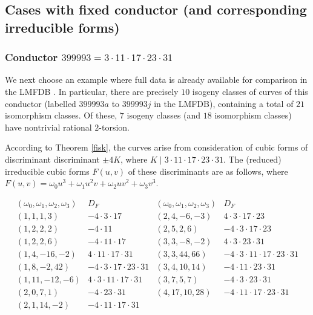 \subsection{Cases with fixed conductor (and corresponding irreducible forms)}

\subsubsection{Conductor $399993 = 3 \cdot 11 \cdot 17 \cdot 23 \cdot 31$} \label{exe1}

We next choose an example where full data is already available for comparison in the LMFDB \cite{LMFDB}. In particular, there are precisely $10$ isogeny classes of curves of this conductor (labelled $399993a$ to $399993j$ in the LMFDB), containing a total of $21$ isomorphism classes. Of these, $7$ isogeny classes (and $18$ isomorphism classes) have nontrivial rational $2$-torsion.

According to Theorem \ref{fisk}, the curves arise from  consideration of cubic forms of discriminant discriminant $\pm 4  K$, where $K \mid 3 \cdot 11 \cdot 17 \cdot 23 \cdot 31$. 
The (reduced)  irreducible cubic forms $F(u,v)$ of these discriminants are as follows, where $F(u,v) =  \omega_0 u^3 + \omega_1 u^2v + \omega_2 uv^2 + \omega_3 v^3$.

$$
\begin{array}{cc|cc} 
(\omega_0,\omega_1,\omega_2,\omega_3) & D_F & (\omega_0,\omega_1,\omega_2,\omega_3)  & D_F \\ \hline
(1,1,1,3) & -4 \cdot 3 \cdot 17 & (2, 4, -6, -3) & 4 \cdot 3 \cdot 17 \cdot 23 \\
(1,2,2,2) & - 4 \cdot 11 & (2, 5, 2, 6) & -4 \cdot 3 \cdot 17 \cdot 23 \\
(1,2,2,6) & -4 \cdot 11 \cdot 17 & (3, 3, -8, -2) & 4 \cdot 3 \cdot 23 \cdot 31 \\
(1, 4, -16, -2) & 4 \cdot 11 \cdot 17 \cdot 31 & (3, 3, 44, 66) &  -4 \cdot 3 \cdot 11 \cdot 17 \cdot 23 \cdot 31 \\
(1, 8, -2, 42) & -4 \cdot 3 \cdot 17 \cdot 23 \cdot 31 & (3, 4, 10, 14) & -4  \cdot 11 \cdot 23 \cdot 31 \\
(1,11,-12,-6) & 4 \cdot 3 \cdot 11 \cdot 17 \cdot 31 & (3, 7, 5, 7) & -4 \cdot 3 \cdot 23 \cdot 31 \\
(2,0,7,1) & -4 \cdot  23 \cdot 31  & (4, 17, 10, 28) & -4 \cdot 11 \cdot 17 \cdot 23 \cdot 31 \\ 
(2, 1, 14, -2) & -4 \cdot 11 \cdot 17 \cdot 31 & & \\
\end{array}
$$

